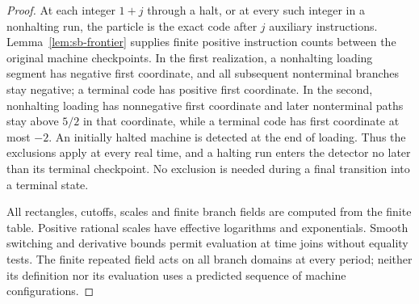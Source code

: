 \begin{proof}
At each integer $1+j$ through a halt, or at every such integer in a
nonhalting run, the particle is the exact code after $j$ auxiliary
instructions. Lemma~\ref{lem:sb-frontier} supplies finite positive
instruction counts between the original machine checkpoints. In the
first realization, a nonhalting loading segment has negative first
coordinate, and all subsequent nonterminal branches stay negative;
a terminal code has positive first coordinate. In the second,
nonhalting loading has nonnegative first coordinate and later
nonterminal paths stay above $5/2$ in that coordinate, while a terminal
code has first coordinate at most $-2$. An initially halted machine is
detected at the end of loading. Thus the exclusions apply at every real
time, and a halting run enters the detector no later than its terminal
checkpoint. No exclusion is needed during a final transition into a
terminal state.

All rectangles, cutoffs, scales and finite branch fields are computed
from the finite table. Positive rational scales have effective logarithms
and exponentials. Smooth switching and derivative bounds permit
evaluation at time joins without equality tests. The finite repeated
field acts on all branch domains at every period; neither its definition
nor its evaluation uses a predicted sequence of machine configurations.
\end{proof}
